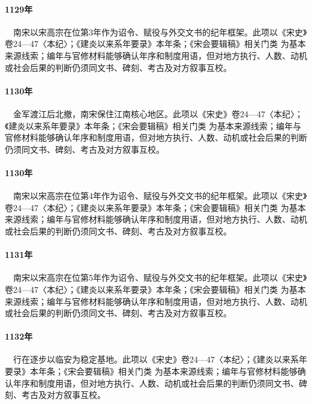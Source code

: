 \paragraph{1129年}　南宋以宋高宗在位第3年作为诏令、赋役与外交文书的纪年框架。此项以《宋史》卷24—47〈本纪〉；《建炎以来系年要录》本年条；《宋会要辑稿》相关门类 为基本来源线索；编年与官修材料能够确认年序和制度用语，但对地方执行、人数、动机或社会后果的判断仍须同文书、碑刻、考古及对方叙事互校。

\paragraph{1130年}　金军渡江后北撤，南宋保住江南核心地区。此项以《宋史》卷24—47〈本纪〉；《建炎以来系年要录》本年条；《宋会要辑稿》相关门类 为基本来源线索；编年与官修材料能够确认年序和制度用语，但对地方执行、人数、动机或社会后果的判断仍须同文书、碑刻、考古及对方叙事互校。

\paragraph{1130年}　南宋以宋高宗在位第4年作为诏令、赋役与外交文书的纪年框架。此项以《宋史》卷24—47〈本纪〉；《建炎以来系年要录》本年条；《宋会要辑稿》相关门类 为基本来源线索；编年与官修材料能够确认年序和制度用语，但对地方执行、人数、动机或社会后果的判断仍须同文书、碑刻、考古及对方叙事互校。

\paragraph{1131年}　南宋以宋高宗在位第5年作为诏令、赋役与外交文书的纪年框架。此项以《宋史》卷24—47〈本纪〉；《建炎以来系年要录》本年条；《宋会要辑稿》相关门类 为基本来源线索；编年与官修材料能够确认年序和制度用语，但对地方执行、人数、动机或社会后果的判断仍须同文书、碑刻、考古及对方叙事互校。

\paragraph{1132年}　行在逐步以临安为稳定基地。此项以《宋史》卷24—47〈本纪〉；《建炎以来系年要录》本年条；《宋会要辑稿》相关门类 为基本来源线索；编年与官修材料能够确认年序和制度用语，但对地方执行、人数、动机或社会后果的判断仍须同文书、碑刻、考古及对方叙事互校。

